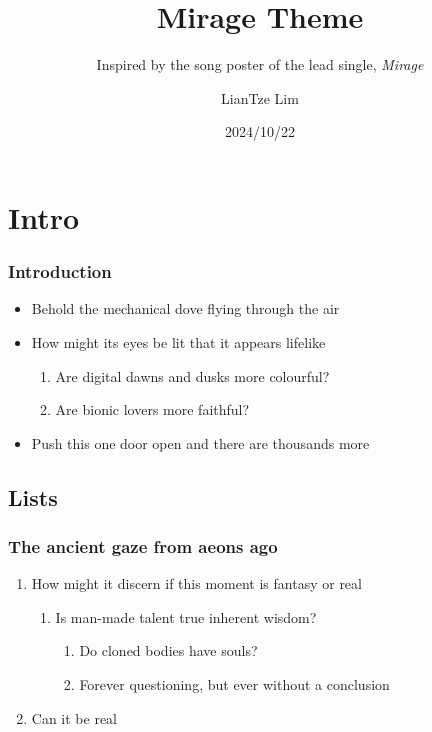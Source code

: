 \documentclass[aspectratio=1610]{beamer}
\title{Mirage Theme}
\subtitle{Inspired by the song poster of the lead single, \emph{Mirage}}
\author{LianTze Lim}
\institute{The full album \emph{Shenself} now available on all major music  platforms}
\date{2024/10/22}
\begin{document}
\frame{\maketitle}

\section{Intro}
\begin{frame}
\frametitle{Introduction}

\begin{itemize}
    \item Behold the mechanical dove \faDove{} flying through the air 
    \item How might its eyes be lit \faEye[regular] that it appears lifelike

\begin{enumerate}
    \item Are digital dawns and dusks \faCloudSun{} more colourful? \faCloudMoon
    \item Are bionic lovers \faGrinHearts{} more faithful? \faGrin*[regular]
\end{enumerate}

    \item Push this one door open \faDoorOpen{} and there are thousands more \faDoorClosed{\small\faDoorClosed}{\footnotesize\faDoorClosed}{\scriptsize\faDoorClosed}{\tiny\faDoorClosed}
\end{itemize}

\end{frame}

\subsection{Lists}
\begin{frame}
\frametitle{The ancient gaze from aeons ago}
    \begin{enumerate}
        \item How might it discern if this moment is fantasy or real
        \begin{enumerate}
	        \item Is man-made talent true inherent wisdom?
	        \begin{enumerate}
		        \item Do cloned bodies have souls?
		        \item Forever questioning, but ever without a conclusion
	        \end{enumerate}
        \end{enumerate}
        \item \alert{Can it be real}
    \end{enumerate}

\end{frame}
\end{document}
